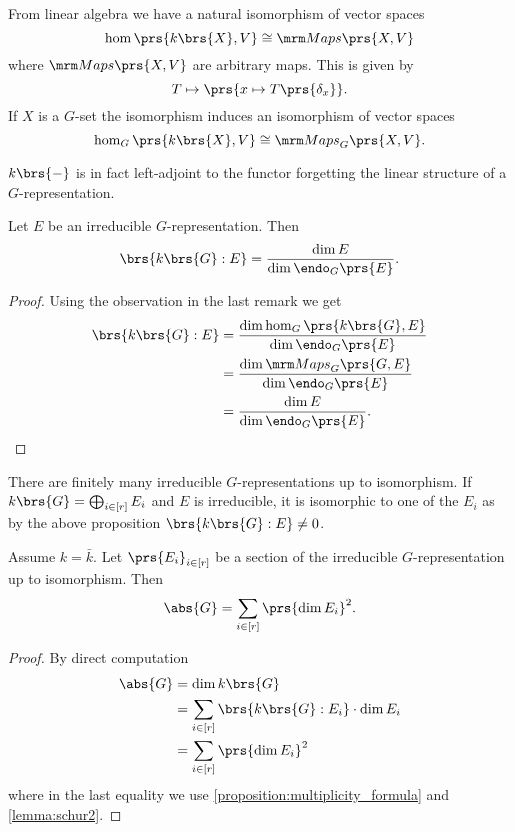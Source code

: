 \documentclass[10pt,a4paper,twoside,openany,hidelinks]{book}
\begin{document}
\begin{remark}
From linear algebra we have a natural isomorphism of vector spaces
\[\hom\prs{k\brs{X}, V} \cong \Maps\prs{X,V}\]
where $\Maps\prs{X,V}$ are arbitrary maps.
This is given by
\[T \mapsto \prs{x \mapsto T\prs{\delta_x}} \text{.}\]
If $X$ is a $G$-set the isomorphism induces an isomorphism of vector spaces
\[\hom_G\prs{k\brs{X}, V} \cong \Maps_G\prs{X,V} \text{.}\]
\end{remark}

\begin{fact}
$k\brs{-}$ is in fact left-adjoint to the functor forgetting the linear structure of a $G$-representation.
\end{fact}

\begin{proposition}\label{proposition:multiplicity_formula}
Let $E$ be an irreducible $G$-representation.
Then
\[\brs{k\brs{G} : E} = \frac{\dim E}{\dim \endo_G\prs{E}} \text{.}\]
\end{proposition}

\begin{proof}
Using the observation in the last remark we get
\begin{align*}
\brs{k\brs{G} : E} &=
\frac{\dim \hom_G\prs{k\brs{G}, E}}{\dim \endo_G\prs{E}}
\\&=
\frac{\dim \Maps_G\prs{G,E}}{\dim \endo_G\prs{E}}
\\&=
\frac{\dim E}{\dim \endo_G\prs{E}} \text{.}
\end{align*}
\end{proof}

\begin{corollary}
There are finitely many irreducible $G$-representations up to isomorphism.
If $k\brs{G} = \bigoplus_{i \in [r]} E_i$ and $E$ is irreducible, it is isomorphic to one of the $E_i$ as by the above proposition $\brs{k\brs{G} : E} \neq 0$. 
\end{corollary}

\begin{corollary}\label{corollary:sum_of_irreducible_dimensions}
Assume $k = \bar{k}$. Let $\prs{E_i}_{i \in [r]}$ be a section of the irreducible $G$-representation up to isomorphism.
Then
\[\abs{G} = \sum_{i \in [r]} \prs{\dim E_i}^2 \text{.}\]
\end{corollary}

\begin{proof}
By direct computation
\begin{align*}
\abs{G} &= \dim k\brs{G}
\\&= \sum_{i \in [r]} \brs{k\brs{G} : E_i} \cdot \dim E_i
\\&=
\sum_{i \in [r]} \prs{\dim E_i}^2
\end{align*}
where in the last equality we use \ref{proposition:multiplicity_formula} and \ref{lemma:schur2}.
\end{proof}
\end{document}
